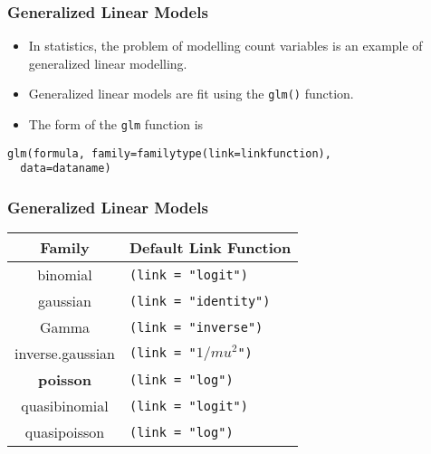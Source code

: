\documentclass[MASTER.tex]{subfiles}
\begin{document}
\begin{frame}[fragile]
\frametitle{Generalized Linear Models}\large
\begin{itemize}
\item In statistics, the problem of modelling count variables is an example of generalized linear modelling.
\item Generalized linear models are fit using the \texttt{glm()} function. 
\item The form of the \texttt{glm} function is
\end{itemize}
{
\normalsize
\begin{framed}
 \begin{verbatim}
glm(formula, family=familytype(link=linkfunction),
  data=dataname)
\end{verbatim}
\end{framed}
}
\end{frame}
\begin{frame}[fragile]
	\frametitle{Generalized Linear Models}
	\large
\begin{center}
\begin{tabular}{|c|l|} \hline
	Family &	Default Link Function \\ \hline \hline 
	binomial&	\texttt{(link = "logit")} \\ \hline
	gaussian&	\texttt{(link = "identity")} \\ \hline
	Gamma&	\texttt{(link = "inverse")} \\ \hline
	inverse.gaussian&	\texttt{(link = "$1/mu^2$")} \\ \hline
	\textbf{poisson}	&\texttt{(link = "log")} \\ \hline
	quasibinomial&	\texttt{(link = "logit")} \\ \hline
	quasipoisson&	\texttt{(link = "log")} \\ \hline
	
\end{tabular}
\end{center}
 
\end{frame}
\end{document}
